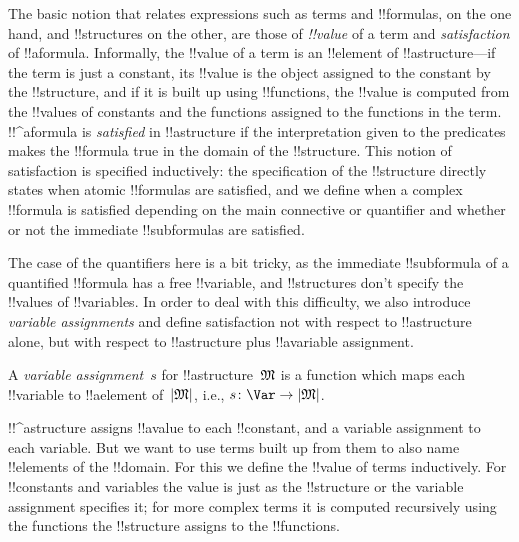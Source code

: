 \documentclass[../../../include/open-logic-section]{subfiles}
\begin{document}


\begin{explain}
The basic notion that relates expressions such as terms and
!!{formula}s, on the one hand, and !!{structure}s on the other, are
those of \emph{!!{value}} of a term and \emph{satisfaction} of 
!!a{formula}.  Informally, the !!{value} of a term is an !!{element} of
!!a{structure}---if the term is just a constant, its !!{value} is the
object assigned to the constant by the !!{structure}, and if it is
built up using !!{function}s, the !!{value} is computed from the
!!{value}s of constants and the functions assigned to the functions in
the term.  !!^a{formula} is \emph{satisfied} in !!a{structure} if the
interpretation given to the predicates makes the !!{formula} true in
the domain of the !!{structure}. This notion of satisfaction is
specified inductively: the specification of the !!{structure} directly
states when atomic !!{formula}s are satisfied, and we define when a
complex !!{formula} is satisfied depending on the main connective or
quantifier and whether or not the immediate !!{subformula}s are
satisfied. 

The case of the quantifiers here is a bit tricky, as the
immediate !!{subformula} of a quantified !!{formula} has a free
!!{variable}, and !!{structure}s don't specify the !!{value}s of
!!{variable}s.  In order to deal with this difficulty, we also
introduce \emph{variable assignments} and define satisfaction not with
respect to !!a{structure} alone, but with respect to !!a{structure}
plus !!a{variable} assignment.
\end{explain}

\begin{defn}
A \emph{variable assignment}~$s$ for !!a{structure}~$\Struct{M}$ is a
function which maps each !!{variable} to !!a{element} of~$\Domain M$,
i.e., $s\colon \Var \to \Domain M$.
\end{defn}

\begin{explain}
!!^a{structure} assigns !!a{value} to each !!{constant}, and a
variable assignment to each variable.  But we want to use terms built
up from them to also name !!{element}s of the !!{domain}.  For this we
define the !!{value} of terms inductively. For !!{constant}s and
variables the value is just as the !!{structure} or the variable
assignment specifies it; for more complex terms it is computed
recursively using the functions the !!{structure} assigns to the
!!{function}s.
\end{explain}
\end{document}
